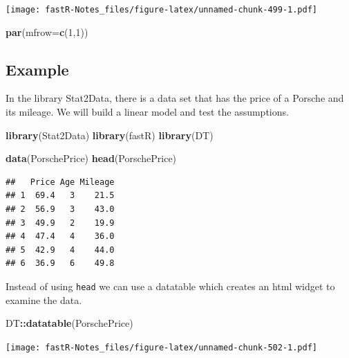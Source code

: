 \documentclass[]{book}
\newenvironment{Shaded}{\begin{snugshade}}{\end{snugshade}}
\newcommand{\KeywordTok}[1]{\textcolor[rgb]{0.13,0.29,0.53}{\textbf{#1}}}
\newcommand{\DataTypeTok}[1]{\textcolor[rgb]{0.13,0.29,0.53}{#1}}
\newcommand{\DecValTok}[1]{\textcolor[rgb]{0.00,0.00,0.81}{#1}}
\newcommand{\OperatorTok}[1]{\textcolor[rgb]{0.81,0.36,0.00}{\textbf{#1}}}
\newcommand{\NormalTok}[1]{#1}
\theoremstyle{definition}
\theoremstyle{definition}
\theoremstyle{definition}
\theoremstyle{remark}
\begin{document}
\texttt{[image: fastR-Notes\_files/figure-latex/unnamed-chunk-499-1.pdf]}

\begin{Shaded}
\begin{Highlighting}[]
\KeywordTok{par}\NormalTok{(}\DataTypeTok{mfrow=}\KeywordTok{c}\NormalTok{(}\DecValTok{1}\NormalTok{,}\DecValTok{1}\NormalTok{))}
\end{Highlighting}
\end{Shaded}

\subsection{Example}\label{example-5}

In the library Stat2Data, there is a data set that has the price of a
Porsche and its mileage. We will build a linear model and test the
assumptions.

\begin{Shaded}
\begin{Highlighting}[]
\KeywordTok{library}\NormalTok{(Stat2Data)}
\KeywordTok{library}\NormalTok{(fastR)}
\KeywordTok{library}\NormalTok{(DT)}
\end{Highlighting}
\end{Shaded}

\begin{Shaded}
\begin{Highlighting}[]
\KeywordTok{data}\NormalTok{(PorschePrice)}
\KeywordTok{head}\NormalTok{(PorschePrice)}
\end{Highlighting}
\end{Shaded}

\begin{verbatim}
##   Price Age Mileage
## 1  69.4   3    21.5
## 2  56.9   3    43.0
## 3  49.9   2    19.9
## 4  47.4   4    36.0
## 5  42.9   4    44.0
## 6  36.9   6    49.8
\end{verbatim}

Instead of using \texttt{head} we can use a datatable which creates an
html widget to examine the data.

\begin{Shaded}
\begin{Highlighting}[]
\NormalTok{DT}\OperatorTok{::}\KeywordTok{datatable}\NormalTok{(PorschePrice)}
\end{Highlighting}
\end{Shaded}

\texttt{[image: fastR-Notes\_files/figure-latex/unnamed-chunk-502-1.pdf]}
\end{document}
